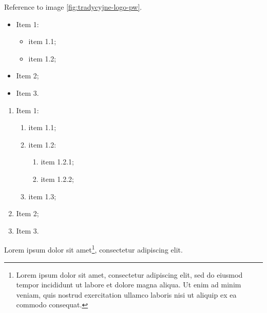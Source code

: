 \documentclass[
    bindingoffset=5mm,  %
    footnoteindent=3mm, %
    hyphenation=true    %
]{src/wut-thesis}
\begin{document}
\lipsum[2] Reference to image \ref{fig:tradycyjne-logo-pw}.

\begin{itemize}
    \item Item 1:
    \begin{itemize}[label=---]
        \item item 1.1;
        \item item 1.2;
    \end{itemize}
    \item Item 2;
    \item Item 3.
\end{itemize}

\lipsum[3]

\begin{enumerate}
    \item Item 1:
    \begin{enumerate}
        \item item 1.1;
        \item item 1.2:
        \begin{enumerate}
            \item item 1.2.1;
            \item item 1.2.2;
        \end{enumerate}
        \item item 1.3;
    \end{enumerate}
    \item Item 2;
    \item Item 3.
\end{enumerate}

\lipsum[4] Lorem ipsum dolor sit amet\footnote{Lorem ipsum dolor sit amet, consectetur adipiscing elit, sed do eiusmod tempor incididunt ut labore et dolore magna aliqua. Ut enim ad minim veniam, quis nostrud exercitation ullamco laboris nisi ut aliquip ex ea commodo consequat.}, consectetur adipiscing elit.
\end{document}
